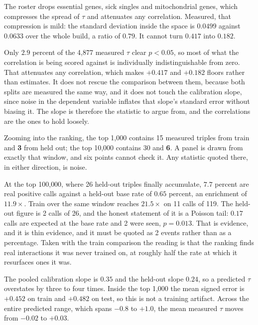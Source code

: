 The roster drops essential
genes, sick singles and mitochondrial genes, which compresses the spread of $\tau$
and attenuates any correlation. Measured, that compression is mild: the standard
deviation inside the space is $0.0499$ against $0.0633$ over the whole build, a
ratio of $0.79$. It cannot turn $0.417$ into $0.182$.

Only $2.9$ percent of the 4{,}877 measured $\tau$ clear $p < 0.05$, so most of
what the correlation is being scored against is individually indistinguishable
from zero. That attenuates any correlation, which makes $+0.417$ and $+0.182$
floors rather than estimates. It does not rescue the comparison between them,
because both splits are measured the same way, and it does not touch the
calibration slope, since noise in the dependent variable inflates that slope's
standard error without biasing it. The slope is therefore the statistic to argue
from, and the correlations are the ones to hold loosely.

 Zooming
into the ranking, the top 1{,}000 contains 15 measured triples from train and
\textbf{3} from held out; the top 10{,}000 contains 30 and \textbf{6}. A panel is
drawn from exactly that window, and six points cannot check it. Any statistic
quoted there, in either direction, is noise.

At the top 100{,}000, where 26 held-out triples finally accumulate, $7.7$ percent
are real positive calls against a held-out base rate of $0.65$ percent, an
enrichment of $11.9\times$. Train over the same window reaches $21.5\times$ on 11
calls of 119. The held-out figure is 2 calls of 26, and the honest statement of
it is a Poisson tail: $0.17$ calls are expected at the base rate and 2 were seen,
$p = 0.013$. That is evidence, and it is thin evidence, and it must be quoted as
2 events rather than as a percentage. Taken with the train comparison the reading
is that the ranking finds real interactions it was never trained on, at roughly
half the rate at which it resurfaces ones it was.

The pooled calibration slope is $0.35$ and the held-out slope $0.24$, so a
predicted $\tau$ overstates by three to four times. Inside the top 1{,}000 the mean
signed error is $+0.452$ on train and $+0.482$ on test, so this is not a training
artifact. Across the entire predicted range, which spans $-0.8$ to $+1.0$, the mean
measured $\tau$ moves from $-0.02$ to $+0.03$.

